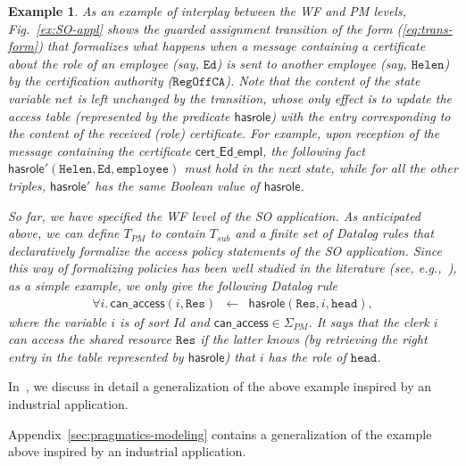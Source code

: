 \documentclass[conference]{IEEEtran}
\newtheorem{example}{Example}
\newcommand{\close}{\IEEEQEDclosed}
\begin{document}
\begin{example}
  As an example of interplay between the WF and PM levels,
  Fig.~\ref{ex:SO-appl} shows the guarded assignment transition of the
  form (\ref{eq:trans-form}) that formalizes what happens when a
  message containing a certificate about the role of an employee (say,
  $\mathtt{Ed}$) is sent to another employee (say, $\mathtt{Helen}$)
  by the certification authority ($\mathtt{RegOffCA}$).  Note that the
  content of the state variable $\mathit{net}$ is left unchanged by
  the transition, whose only effect is to update the access table
  (represented by the predicate $\mathsf{hasrole}$) with the entry
  corresponding to the content of the received (role) certificate.
  For example, upon reception of the message containing the
  certificate $\mathsf{cert\_Ed\_empl}$, the following fact
  $\mathsf{hasrole}'(\mathtt{Helen}, \mathtt{Ed}, \mathtt{employee})$
  must hold in the next state, while for all the other triples,
  $\mathsf{hasrole}'$ has the same Boolean value of
  $\mathsf{hasrole}$.

  So far, we have specified the WF level of the SO application.  As
  anticipated above, we can define $T_\mathit{PM}$ to contain $T_\mathit{sub}$ and a
  finite set of Datalog rules that declaratively formalize the access
  policy statements of the SO application.  Since this way of
  formalizing policies has been well studied in the literature (see,
  e.g.,~\cite{deTreville:Binder}), as a simple example, we only give
  the following Datalog rule
  \begin{eqnarray*}
    \forall i.\,
    \mathsf{can\_access}(i,\mathtt{Res}) 
     & \leftarrow &
     \mathsf{hasrole}(\mathtt{Res},i,\mathtt{head}) ,
  \end{eqnarray*}
  where the variable $i$ is of sort $\mathit{Id}$ and
  $\mathsf{can\_access} \in \Sigma_\mathit{PM}$.  It says that the clerk $i$
  can access the shared resource $\mathtt{Res}$ if the latter knows
  (by retrieving the right entry in the table represented by
  $\mathsf{hasrole}$) that $i$ has the role of $\mathtt{head}$.
  \hfill \close
\end{example}

\begin{SHORT}
  In~\cite{BRV-TR09}, we discuss in detail a generalization of the above
  example inspired by an industrial application.
\end{SHORT}
\begin{LONG}
  Appendix~\ref{sec:pragmatics-modeling} contains a generalization of
  the example above inspired by an industrial application.
\end{LONG}
\end{document}
